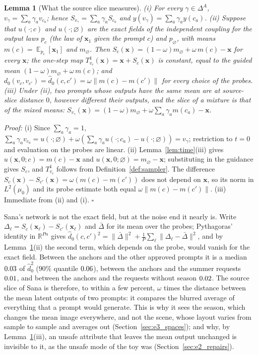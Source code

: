 \documentclass{article}
\DeclareMathOperator{\E}{\mathbb{E}}
\newcommand{\RR}{\mathbb{R}}
\newcommand{\bx}{\mathbf{x}}
\theoremstyle{plain}
\newtheorem{lemma}[theorem]{Lemma}
\theoremstyle{remark}
\begin{document}
\begin{lemma}[What the source slice measures]\label{lem:slice_mean}
(i) For every $\gamma\in\Delta^A$, $v_\gamma=\sum_a\gamma_av_{c_a}$; hence $S_{v_\gamma}=\sum_a\gamma_aS_{c_a}$ and
$y(v_\gamma)=\sum_a\gamma_ay(c_a)$.
(ii) Suppose that $u(\cdot;c)$ and $u(\cdot;\varnothing)$ are the exact fields of the independent coupling for the output laws $p_c$
(the law of $\bx_1$ given the prompt $c$) and $p_\varnothing$, with means $m(c)=\E_{p_c}[\bx_1]$ and $m_\varnothing$. Then
$S_c(\bx)=(1-\omega)m_\varnothing+\omega\,m(c)-\bx$ for every $\bx$; the one-step map $T^1_{v_c}(\bx)=\bx+S_c(\bx)$ is constant, equal to
the guided mean $(1-\omega)m_\varnothing+\omega\,m(c)$; and $d_0(v_c,v_{c'})=\hat d_0(c,c')=\omega\|m(c)-m(c')\|$ for every choice of the
probes.
(iii) Under (ii), two prompts whose outputs have the same mean are at source-slice distance $0$, however different their outputs, and
the slice of a mixture is that of the mixed means: $S_{v_\gamma}(\bx)=(1-\omega)m_\varnothing+\omega\sum_a\gamma_am(c_a)-\bx$.
\end{lemma}
\textit{Proof:}
(i) Since $\sum_a\gamma_a=1$, $\sum_a\gamma_av_{c_a}=u(\cdot;\varnothing)+\omega(\sum_a\gamma_au(\cdot;c_a)-u(\cdot;\varnothing))=v_\gamma$; restriction to $t=0$
and evaluation on the probes are linear. (ii) Lemma~\ref{lem:time}(iii) gives $u(\bx,0;c)=m(c)-\bx$ and $u(\bx,0;\varnothing)=m_\varnothing-\bx$;
substituting in the guidance gives $S_c$, and $T^1_{v_c}$ follows from Definition~\ref{def:sampler}. The difference
$S_c(\bx)-S_{c'}(\bx)=\omega(m(c)-m(c'))$ does not depend on $\bx$, so its norm in $L^2(\mu_0)$ and its probe estimate both equal
$\omega\|m(c)-m(c')\|$. (iii) Immediate from (ii) and (i). \hfill$\square$

Sana's network is not the exact field, but at the noise end it nearly is. Write $\Delta_\ell=S_c(\bx_\ell)-S_{c'}(\bx_\ell)$ and
$\bar\Delta$ for its mean over the probes; Pythagoras' identity in $\RR^{Pn}$ gives
$\hat d_0(c,c')^2=\|\bar\Delta\|^2+\frac1P\sum_\ell\|\Delta_\ell-\bar\Delta\|^2$, and by Lemma~\ref{lem:slice_mean}(ii) the second term,
which depends on the probe, would vanish for the exact field. Between the anchors and the other approved prompts it is a median
$0.03$ of $\hat d_0^2$ ($90\%$ quantile $0.06$), between the anchors and the summer requests $0.01$, and
between the anchors and the requests without season $0.02$. The source slice of Sana is therefore, to within a few percent,
$\omega$ times the distance between the mean latent outputs of two prompts: it compares the blurred average of everything that a
prompt would generate. This is why it sees the season, which changes the mean image everywhere, and not the scene, whose layout
varies from sample to sample and averages out (Section~\ref{sec:e3_spaces}); and why, by Lemma~\ref{lem:slice_mean}(iii), an unsafe
attribute that leaves the mean output unchanged is invisible to it, as the unsafe mode of the toy was (Section~\ref{sec:e2_repairs}).
\end{document}
